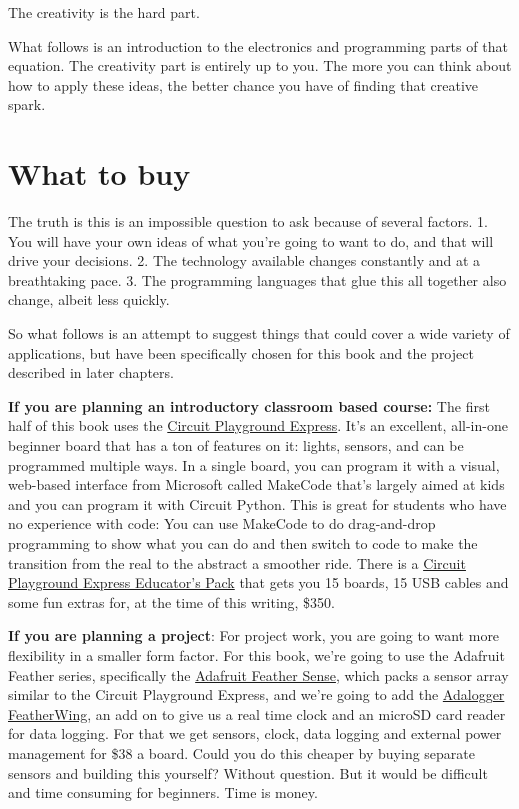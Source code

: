 \documentclass[
]{book}
\begin{document}
The creativity is the hard part.

What follows is an introduction to the electronics and programming parts of that equation. The creativity part is entirely up to you. The more you can think about how to apply these ideas, the better chance you have of finding that creative spark.

\hypertarget{what-to-buy}{%
\section{What to buy}\label{what-to-buy}}

The truth is this is an impossible question to ask because of several factors.
1. You will have your own ideas of what you're going to want to do, and that will drive your decisions.
2. The technology available changes constantly and at a breathtaking pace.
3. The programming languages that glue this all together also change, albeit less quickly.

So what follows is an attempt to suggest things that could cover a wide variety of applications, but have been specifically chosen for this book and the project described in later chapters.

\textbf{If you are planning an introductory classroom based course:} The first half of this book uses the \href{https://www.adafruit.com/product/3333}{Circuit Playground Express}. It's an excellent, all-in-one beginner board that has a ton of features on it: lights, sensors, and can be programmed multiple ways. In a single board, you can program it with a visual, web-based interface from Microsoft called MakeCode that's largely aimed at kids and you can program it with Circuit Python. This is great for students who have no experience with code: You can use MakeCode to do drag-and-drop programming to show what you can do and then switch to code to make the transition from the real to the abstract a smoother ride. There is a \href{https://www.adafruit.com/product/3399}{Circuit Playground Express Educator's Pack} that gets you 15 boards, 15 USB cables and some fun extras for, at the time of this writing, \$350.

\textbf{If you are planning a project}: For project work, you are going to want more flexibility in a smaller form factor. For this book, we're going to use the Adafruit Feather series, specifically the \href{https://www.adafruit.com/product/4516}{Adafruit Feather Sense}, which packs a sensor array similar to the Circuit Playground Express, and we're going to add the \href{https://www.adafruit.com/product/2922}{Adalogger FeatherWing}, an add on to give us a real time clock and an microSD card reader for data logging. For that we get sensors, clock, data logging and external power management for \$38 a board. Could you do this cheaper by buying separate sensors and building this yourself? Without question. But it would be difficult and time consuming for beginners. Time is money.
\end{document}
